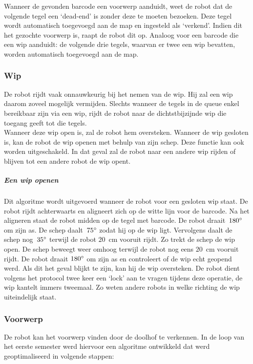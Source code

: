 \documentclass[eind]{penoverslag}
\begin{document}

Wanneer de gevonden barcode een voorwerp aanduidt, weet de robot dat de volgende tegel een `dead-end' is zonder deze te moeten bezoeken. Deze tegel wordt automatisch toegevoegd aan de map en ingesteld als `verkend'. Indien dit het gezochte voorwerp is, raapt de robot dit op.
Analoog voor een barcode die een wip aanduidt: de volgende drie tegels, waarvan er twee een wip bevatten, worden automatisch toegevoegd aan de map.


\subsubsection{Wip}
\label{sssec:AlgoWip}
De robot rijdt vaak onnauwkeurig bij het nemen van de wip. Hij zal een wip daarom zoveel mogelijk vermijden. Slechts wanneer de tegels in de queue enkel bereikbaar zijn via een wip, rijdt de robot naar de dichtstbijzijnde wip die toegang geeft tot die tegels.\\

Wanneer deze wip open is, zal de robot hem oversteken. Wanneer de wip gesloten is, kan de robot de wip openen met behulp van zijn schep. Deze functie kan ook worden uitgeschakeld. In dat geval zal de robot naar een andere wip rijden of blijven tot een andere robot de wip opent.

\subparagraph{Een wip openen} 
Dit algoritme wordt uitgevoerd wanneer de robot voor een gesloten wip staat. De robot rijdt achterwaarts en aligneert zich op de witte lijn voor de barcode. Na het aligneren staat de robot midden op de tegel met barcode. De robot draait~$180\degree$ om zijn as. De schep daalt~$75\degree$ zodat hij op de wip ligt. Vervolgens daalt de schep nog~$35\degree$ terwijl de robot $20$~cm vooruit rijdt. Zo trekt de schep de wip open. De schep beweegt weer omhoog terwijl de robot nog eens $20$~cm vooruit rijdt. De robot draait $180\degree$ om zijn as en controleert of de wip echt geopend werd. Als dit het geval blijkt te zijn, kan hij de wip oversteken. De robot dient volgens het protocol twee keer een `lock' aan te vragen tijdens deze operatie, de wip kantelt immers tweemaal. Zo weten andere robots in welke richting de wip uiteindelijk staat.

\subsubsection{Voorwerp} %
\label{sssec:AlgoZoek}
De robot kan het voorwerp vinden door de doolhof te verkennen. In de loop van het eerste semester werd hiervoor een algoritme ontwikkeld dat werd geoptimaliseerd in volgende stappen: 
\end{document}
